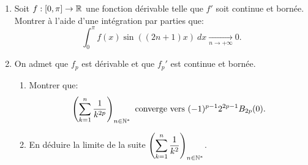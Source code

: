 \begin{enumerate}
\item  Soit $f:[0, \pi]\to \mathbb{R}$ une fonction dérivable telle que $f'$ soit continue et bornée. Montrer à l'aide d'une intégration par parties que:
\[ \int_{0}^{\pi}f(x)\sin ((2n+1)x)\ dx \xrightarrow[n\to + \infty]{}0.\]

\item On admet que $f_{p}$ est dérivable et que $f_{p}'$ est continue et bornée. 
\begin{enumerate}
 \item  Montrer que:
 \[ 
 \left( \sum_{k=1}^{n}\frac{1}{k^{2p}}\right)_{n\in \mathbb{N}^*} \text{ converge vers } (-1)^{p-1}2^{2p-1}B_{2p}(0).
 \]
 \item En déduire la limite de la suite $\displaystyle{\left( \sum_{k=1}^{n}\frac{1}{k^{2}}\right)_{n\in \mathbb{N}^*}}$.
\end{enumerate}

\end{enumerate}
